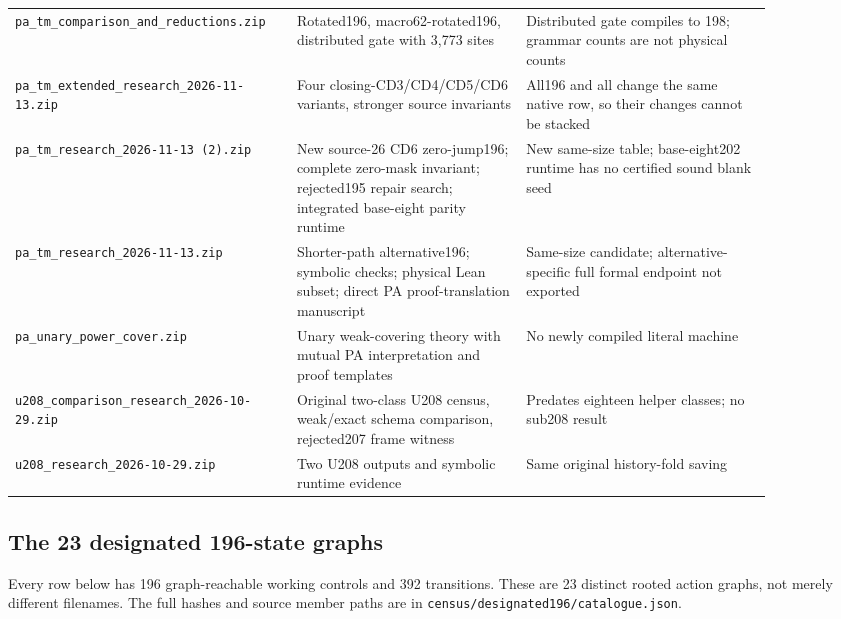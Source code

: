 \begin{longtable}{@{}>{\raggedright\arraybackslash}p{0.29\linewidth}>{\raggedright\arraybackslash}p{0.29\linewidth}>{\raggedright\arraybackslash}p{0.3\linewidth}@{}}
\nolinkurl{pa_tm_comparison_and_reductions.zip} & Rotated196, macro62-rotated196, distributed gate with 3,773 sites & Distributed gate compiles to 198; grammar counts are not physical counts\\
\nolinkurl{pa_tm_extended_research_2026-11-13.zip} & Four closing-CD3/CD4/CD5/CD6 variants, stronger source invariants & All196 and all change the same native row, so their changes cannot be stacked\\
\nolinkurl{pa_tm_research_2026-11-13 (2).zip} & New source-26 CD6 zero-jump196; complete zero-mask invariant; rejected195 repair search; integrated base-eight parity runtime & New same-size table; base-eight202 runtime has no certified sound blank seed\\
\nolinkurl{pa_tm_research_2026-11-13.zip} & Shorter-path alternative196; symbolic checks; physical Lean subset; direct PA proof-translation manuscript & Same-size candidate; alternative-specific full formal endpoint not exported\\
\nolinkurl{pa_unary_power_cover.zip} & Unary weak-covering theory with mutual PA interpretation and proof templates & No newly compiled literal machine\\
\nolinkurl{u208_comparison_research_2026-10-29.zip} & Original two-class U208 census, weak/exact schema comparison, rejected207 frame witness & Predates eighteen helper classes; no sub208 result\\
\nolinkurl{u208_research_2026-10-29.zip} & Two U208 outputs and symbolic runtime evidence & Same original history-fold saving\\
\end{longtable}
\endgroup

\subsection{The 23 designated 196-state graphs}

Every row below has 196 graph-reachable working controls and 392 transitions.
These are 23 distinct rooted action graphs, not merely different filenames.
The full hashes and source member paths are in
\nolinkurl{census/designated196/catalogue.json}.

